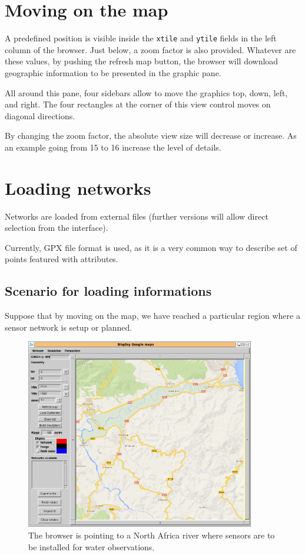 \section{Moving on the map}
A predefined position is visible inside the \verb!xtile! and \verb!ytile! fields 
in the left column of the browser. Just below, a zoom factor is also provided. 
Whatever are these values, by pushing the refresh map button, the browser 
will download geographic information to be presented in the graphic pane. 

All around this pane, four sidebars allow to move the graphics top, down, left, and right. 
The four rectangles at the corner of this view control moves on diagonal directions. 

By changing the zoom factor, the absolute view size will decrease or increase. 
As an example going from 15 to 16 increase the level of details. 

\section{Loading networks}
Networks are loaded from external files (further versions will allow direct 
selection from the interface). 

Currently, GPX file format is used, as it is a very common way to describe set of 
points featured with attributes. 

\subsection{Scenario for loading informations}
Suppose that by moving on the map, we have reached a particular region 
where a sensor network is setup or planned.

\begin{figure}
\begin{center}
\includegraphics[width=10cm]{soummam0.png}
\caption{The browser is pointing to a North Africa river where sensors are to be installed
for water observations.}
\label{fig:initialSoummam}
\end{center}
\end{figure}


